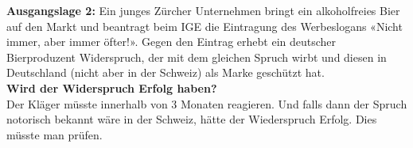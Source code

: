 \textbf{Ausgangslage 2:} Ein junges Zürcher Unternehmen bringt ein
alkoholfreies Bier auf den Markt und beantragt beim IGE die Eintragung
des Werbeslogans «Nicht immer, aber immer öfter!». Gegen den Eintrag
erhebt ein deutscher Bierproduzent Widerspruch, der mit dem gleichen
Spruch wirbt und diesen in Deutschland (nicht aber in der Schweiz) als
Marke geschützt hat.\\

\textbf{Wird der Widerspruch Erfolg haben?}\\
Der Kläger müsste innerhalb von 3 Monaten reagieren. Und falls dann der
Spruch notorisch bekannt wäre in der Schweiz, hätte der Wiederspruch
Erfolg. Dies müsste man prüfen.
